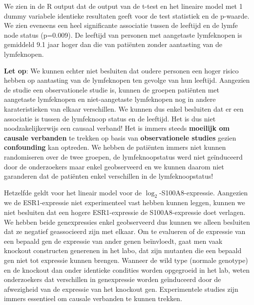 \documentclass[
  12pt,dutch,coursenotes]{book}
\theoremstyle{definition}
\theoremstyle{definition}
\theoremstyle{definition}
\theoremstyle{definition}
\theoremstyle{remark}
\begin{document}
We zien in de R output dat de output van de t-test en het lineaire model met 1 dummy variabele identieke resultaten geeft voor de test statistiek en de p-waarde.
We zien eveneens een heel significante associatie tussen de leeftijd en de lymfe node status (p=0.009).
De leeftijd van personen met aangetaste lymfeknopen is gemiddeld 9.1 jaar hoger dan die van patiënten zonder aantasting van de lymfeknopen.

\textbf{Let op}: We kunnen echter niet besluiten dat oudere personen een hoger risico hebben op aantasting van de lymfeknopen ten gevolge van hun leeftijd.
Aangezien de studie een observationele studie is, kunnen de groepen patiënten met aangetaste lymfeknopen en niet-aangetaste lymfeknopen nog in andere karateristieken van elkaar verschillen.
We kunnen dus enkel besluiten dat er een associatie is tussen de lymfeknoop status en de leeftijd.
Het is dus niet noodzakelijkerwijs een causaal verband!
Het is immers steeds \textbf{moeilijk om causale verbanden} te trekken op basis van \textbf{observationele studies} gezien \textbf{confounding} kan optreden.
We hebben de patiënten immers niet kunnen randomiseren over de twee groepen, de lymfeknoopstatus werd niet geïnduceerd door de onderzoekers maar enkel geobserveerd en we kunnen daarom niet garanderen dat de patiënten enkel verschillen in de lymfeknoopstatus!

Hetzelfde geldt voor het lineair model voor de \(\log_2\)-S100A8-expressie. Aangezien we de ESR1-expressie niet experimenteel vast hebben kunnen leggen, kunnen we niet besluiten dat een hogere ESR1-expressie de S100A8-expressie doet verlagen. We hebben beide genexpressies enkel geobserveerd dus kunnen we alleen besluiten dat ze negatief geassocieerd zijn met elkaar. Om te evalueren of de expressie van een bepaald gen de expressie van ander genen beïnvloedt, gaat men vaak knockout constructen generenen in het labo, dat zijn mutanten die een bepaald gen niet tot expressie kunnen brengen. Wanneer de wild type (normale genotype) en de knockout dan onder identieke condities worden opgegroeid in het lab, weten onderzoekers dat verschillen in genexpressie worden geïnduceerd door de afwezigheid van de expressie van het knockout gen. Experimentele studies zijn immers essentieel om causale verbanden te kunnen trekken.
\end{document}
